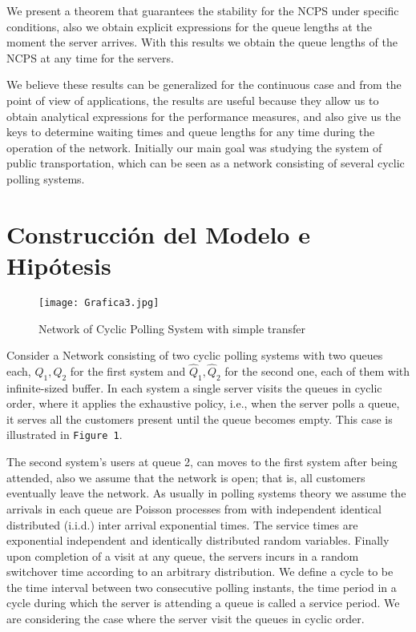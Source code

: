 \documentclass{article}
\begin{document}
We present a theorem that guarantees the stability for the NCPS under specific conditions, also we obtain explicit expressions for the queue lengths at the moment the server arrives. With this results we obtain the queue lengths of the NCPS at any time for the servers.

We believe these results can be generalized for the continuous case and from the point of view of applications, the results are useful because they allow us to obtain analytical expressions for the performance measures, and also give us the keys to determine waiting times and queue lengths for any time during the operation of the network. Initially our main goal was studying the system of public transportation, which can be seen as a network consisting of several cyclic polling systems.

%
\section{Construcci\'on del Modelo e Hip\'otesis}
%
\begin{figure}[H]\caption{Network of Cyclic Polling System with simple transfer}
\centering
\texttt{[image: Grafica3.jpg]}
\end{figure}\label{FigureRSVC}

Consider a Network consisting of two cyclic polling systems with two queues each, $Q_{1}, Q_{2}$ for the first system and $\hat{Q}_{1},\hat{Q}_{2}$ for the second one, each of them with infinite-sized buffer. In each system a single server visits the queues in cyclic order, where it applies the exhaustive policy, i.e., when the server polls a queue, it serves all the customers present until the queue becomes empty. This case is illustrated in \texttt{Figure 1}. 

The second system's users at queue 2, can moves to the first system after being attended, also we assume that the network is open; that is, all customers eventually leave the network. As usually in polling systems theory we assume the arrivals in each queue are Poisson processes from with independent identical distributed (i.i.d.) inter arrival exponential times. The service times are exponential independent and identically distributed random variables. Finally upon completion of a visit at any queue, the servers incurs in a random switchover time according to an arbitrary distribution. We define a cycle to be the time interval between two consecutive polling instants, the time period in a cycle during which the server is attending a queue is called a service period. We are considering the case where the server visit the queues in cyclic order.
\end{document}
